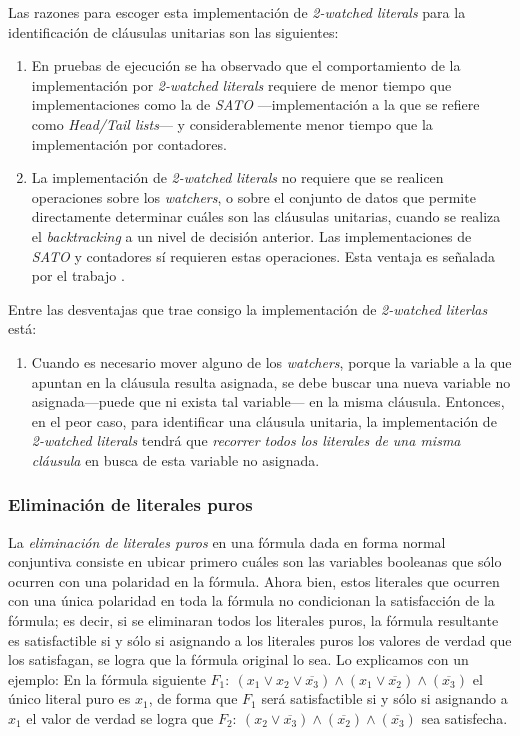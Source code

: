 \documentclass[12pt,lettersize,oneside]{article}
\begin{document}
Las razones para escoger esta implementación de \emph{2-watched literals} para
la identificación de cláusulas unitarias son las siguientes:\vspace{-2.5mm}
\begin{enumerate}
\item En pruebas de ejecución\cite{Zhang} se ha observado que el comportamiento
  de la implementación por \emph{2-watched literals} requiere de menor tiempo
  que implementaciones como la de \emph{SATO} ---implementación a la que
  \cite{Zhang} se refiere como \emph{Head/Tail lists}--- y considerablemente
  menor tiempo que la implementación por contadores.
\item La implementación de \emph{2-watched literals} no requiere que se realicen
  operaciones sobre los \emph{watchers}, o sobre el conjunto de datos que
  permite directamente determinar cuáles son las cláusulas unitarias, cuando se
  realiza el \emph{backtracking} a un nivel de decisión anterior. Las
  implementaciones de \emph{SATO} y contadores sí requieren estas
  operaciones. Esta ventaja es señalada por el trabajo \cite{Marques}.
\end{enumerate}

Entre las desventajas que trae consigo la implementación de \emph{2-watched
  literlas} está:\vspace{-2.5mm}
\begin{enumerate}
\item Cuando es necesario mover alguno de los \emph{watchers}, porque la variable
  a la que apuntan en la cláusula resulta asignada, se debe buscar una nueva
  variable no asignada---puede que ni exista tal variable--- en la misma
  cláusula. Entonces, en el peor caso, para identificar una cláusula unitaria,
  la implementación de \emph{2-watched literals} tendrá que \emph{recorrer todos
    los literales de una misma cláusula} en busca de esta variable no asignada.
\end{enumerate}



\subsubsection{Eliminación de literales puros}

La \emph{eliminación de literales puros} en una fórmula dada en forma normal
conjuntiva consiste en ubicar primero cuáles son las variables booleanas que
sólo ocurren con una polaridad en la fórmula. Ahora bien, estos literales que
ocurren con una única polaridad en toda la fórmula no condicionan la
satisfacción de la fórmula; es decir, si se eliminaran todos los literales
puros, la fórmula resultante es satisfactible si y sólo si asignando a los
literales puros los valores de verdad que los satisfagan, se logra que la
fórmula original lo sea. Lo explicamos con un ejemplo: En la fórmula siguiente
$F_1:\ (x_1 \vee x_2 \vee \overline{x_3}) \wedge (x_1 \vee \overline{x_2})
\wedge (\overline{x_3})$ el único literal puro es $x_1$, de forma que $F_1$ será
satisfactible si y sólo si asignando a $x_1$ el valor de verdad se logra que
$F_2:\ (x_2 \vee \overline{x_3}) \wedge (\overline{x_2}) \wedge
(\overline{x_3})$ sea satisfecha.
\end{document}
